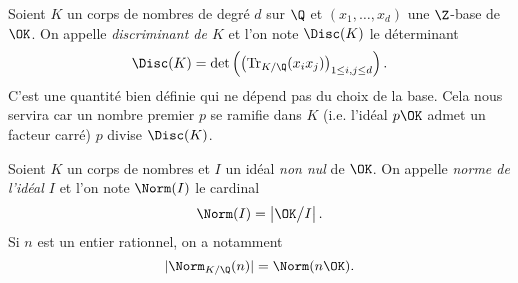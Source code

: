 \begin{rappel}
	Soient $K$ un corps de nombres de degré $d$ sur $\Q$ et $(x_1, \dots, x_d)$ une $\Z$-base de $\OK$. On appelle \emph{discriminant de $K$} et l'on note $\Disc(K)$ le déterminant \[\Disc(K) = \det\left(\left(\mathrm{Tr}_{K/\Q}(x_i x_j)\right)_{1\leq i, j \leq d}\right).\] C'est une quantité bien définie qui ne dépend pas du choix de la base. Cela nous servira car un nombre premier $p$ se ramifie dans $K$ (i.e. l'idéal $p\OK$ admet un facteur carré) \ssi $p$ divise $\Disc(K)$.
\end{rappel}

\begin{rappel}\label{rappel-NormeIdeaux}
	Soient $K$ un corps de nombres et $I$ un idéal \emph{non nul} de $\OK$. On appelle \emph{norme de l'idéal $I$} et l'on note $\Norm(I)$ le cardinal \[\Norm(I) = \left|\OK\big/I\right|.\] Si $n$ est un entier rationnel, on a notamment \[|\Norm_{K/\Q}(n)| = \Norm(n\OK).\]
\end{rappel}
